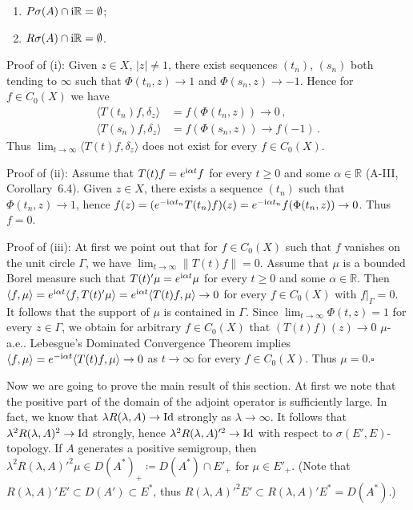\begin{example}
\begin{enumerate}[\upshape (a), wide, labelsep=1em]
\begin{enumerate}[\upshape (i)]
	\item 
	$P\sigma(A)\cap\mathrm{i}\mathbb{R} = \emptyset$;
	
	\item 
	$R\sigma(A)\cap\mathrm{i}\mathbb{R} = \emptyset$.
\end{enumerate}

Proof of (i): Given $z \in X$, $|z| \neq 1$, there exist sequences $(t_n)$, $(s_n)$ both tending to $\infty$ such that $\Phi(t_n,z) \to 1$ and $\Phi(s_n,z) \to -1$. 
Hence for $f \in C_{0}(X)$ we have
\[
   \begin{aligned}
   \langle T(t_n)f,\delta_z \rangle &= f(\Phi(t_n,z)) \to 0\,,\\
   \langle T(s_n)f,\delta_z \rangle &= f(\Phi(s_n,z)) \to f(-1)\,.
   \end{aligned}
\]
Thus $\lim_{t\to\infty} \langle T(t)f,\delta_z \rangle$ does not exist for every $f \in C_{0}(X)$.

Proof of (ii): Assume that $T(t)f = e^{\mathrm{i}\alpha t}f$ for every $t \geq 0$ and some $\alpha \in \mathbb{R}$ (\cf A-III, Corollary~6.4). 
Given $z \in X$, there exists a sequence $(t_n)$ such that $\Phi(t_n,z) \to 1$, hence
$f(z) = (e^{-\mathrm{i}\alpha t_n}T(t_n)f)(z) = e^{-\mathrm{i}\alpha t_n}f(\Phi(t_n,z)) \to 0$. Thus $f = 0$.

Proof of (iii): At first we point out that for $f \in C_{0}(X)$ such that $f$ vanishes on the unit circle $\Gamma$, we have $\lim_{t\to\infty} \|T(t)f\| = 0$.
Assume that $\mu$ is a bounded Borel measure such that $T(t)'\mu = e^{\mathrm{i}\alpha t}\mu$ for every $t \geq 0$ and some $\alpha \in \mathbb{R}$. 
Then $\langle f,\mu \rangle = e^{\mathrm{i}\alpha t}\langle f,T(t)'\mu \rangle = e^{\mathrm{i}\alpha t}\langle T(t)f,\mu \rangle \to 0$ for every $f \in C_{0}(X)$ with $f|_\Gamma = 0$. 
It follows that the support of $\mu$ is contained in $\Gamma$. Since $\lim_{t\to\infty} \Phi(t,z) = 1$ for every $z \in \Gamma$, we obtain for arbitrary $f \in C_{0}(X)$ that $(T(t)f)(z) \to 0$ $\mu$-a.e.. 
Lebesgue's Dominated Convergence Theorem implies $\langle f,\mu \rangle = e^{-\mathrm{i}\alpha t}\langle T(t)f,\mu \rangle \to 0$ as $t \to \infty$ for every $f \in C_{0}(X)$. Thus $\mu = 0$.\hfill$\square$
\end{enumerate}
\end{example}

Now we are going to prove the main result of this section. 
At first we note that the positive part of the domain of the adjoint operator is sufficiently large. 
In fact, we know that $\lambda R(\lambda,A) \to \operatorname{Id} $ strongly as $\lambda \to \infty$. 
It follows that $\lambda^2R(\lambda,A)^2 \to \operatorname{Id} $ strongly, hence $\lambda^2R(\lambda,A)'^2 \to \operatorname{Id} $ with respect to $\sigma(E',E)$-topology. 
If $A$ generates a positive semigroup, then $\lambda^2R(\lambda,A)'^2\mu \in D(A^*)_{+} \coloneq D(A^*)\cap E'_{+}$ for $\mu \in E'_+$. 
(Note that $R(\lambda,A)'E' \subset D(A') \subset E^*$, thus $R(\lambda,A)'^2E' \subset R(\lambda,A)'E^* = D(A^*)$.)

